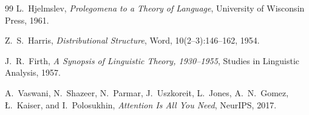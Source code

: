 \documentclass[11pt,a4paper]{article}
\theoremstyle{remark}
\begin{document}
\begin{thebibliography}{99}
 L.~Hjelmslev,
\textit{Prolegomena to a Theory of Language}, University of Wisconsin Press,
1961.

 Z.~S.~Harris,
\textit{Distributional Structure}, Word, 10(2--3):146--162, 1954.

 J.~R.~Firth,
\textit{A Synopsis of Linguistic Theory, 1930--1955}, Studies in Linguistic
Analysis, 1957.

 A.~Vaswani, N.~Shazeer, N.~Parmar, J.~Uszkoreit,
L.~Jones, A.~N.~Gomez, \L.~Kaiser, and I.~Polosukhin,
\textit{Attention Is All You Need}, NeurIPS, 2017.

\end{thebibliography}
\end{document}
